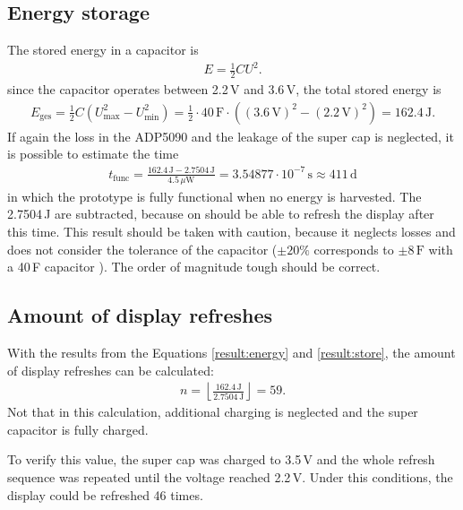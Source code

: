 \subsection{Energy storage}
The stored energy in a capacitor is
\begin{align*}
	E =\frac{1}{2}CU^2.
\end{align*}
since the capacitor operates between 2.2\,V and 3.6\,V, the total stored energy is
\begin{align}
	E_{\text{ges}} = \frac{1}{2}C(U_{\text{max}}^2-U_{\text{min}}^2)=\frac{1}{2}\cdot 40\,\text {F}\cdot((3.6\,\text{V})^2-(2.2\,\text{V})^2)=162.4\,\text{J}\label{result:store}.
\end{align}
If again the loss in the ADP5090 and the leakage of the super cap is neglected, it is possible to estimate the time
\begin{align}
	t_{\text{func}}=\frac{162.4\,\text{J}-2.7504\,\text{J}}{4.5\,\mu\text{W}}=3.54877\cdot 10^{-7}\,\text{s}\approx 411\,\text{d}
\end{align} 
in which the prototype is fully functional when no energy is harvested.
The 2.7504\,J are subtracted, because on should be able to refresh the display after this time.
This result should be taken with caution, because it neglects losses and does not consider the tolerance of the capacitor ($\pm20\%$ corresponds to $\pm8\,\text{F}$ with a 40\,F capacitor \cite{yuden}).
The order of magnitude tough should be correct.

\subsection{Amount of display refreshes}
With the results from the Equations \eqref{result:energy} and \eqref{result:store}, the amount of display refreshes can be calculated:
\begin{align}
	n = \left\lfloor\frac{162.4\,\text{J}}{2.7504\,\text{J}}\right\rfloor=59.
\end{align}
Not that in this calculation, additional charging is neglected and the super capacitor is fully charged.

To verify this value, the super cap was charged to 3.5\,V and the whole refresh sequence was repeated until the voltage reached 2.2\,V.
Under this conditions, the display could be refreshed 46 times.
